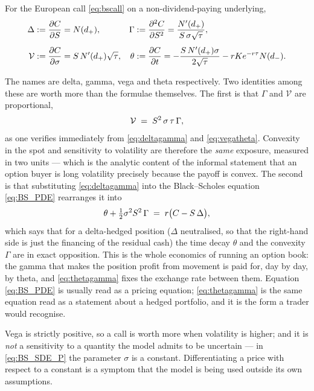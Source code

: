 \begin{proposition}\label{prop:greeks}
For the European call \eqref{eq:bscall} on a non-dividend-paying underlying,
\begin{align}
\Delta &:= \frac{\partial C}{\partial S} = N(d_+), &
\Gamma &:= \frac{\partial^2 C}{\partial S^2} = \frac{N'(d_+)}{S\,\sigma\sqrt{\tau}}, \label{eq:deltagamma}\\[4pt]
\mathcal{V} &:= \frac{\partial C}{\partial \sigma} = S\,N'(d_+)\sqrt{\tau}, &
\theta &:= \frac{\partial C}{\partial t} = -\frac{S\,N'(d_+)\sigma}{2\sqrt{\tau}} - r K e^{-r\tau}N(d_-). \label{eq:vegatheta}
\end{align}
\qedopen
\end{proposition}

The names are delta, gamma, vega and theta respectively. Two identities among these are worth more than the formulae themselves. The first is that
$\Gamma$ and $\mathcal{V}$ are proportional,
\begin{equation}\label{eq:vegagamma}
\mathcal{V} \;=\; S^2\,\sigma\,\tau\,\Gamma ,
\end{equation}
as one verifies immediately from \eqref{eq:deltagamma} and \eqref{eq:vegatheta}. Convexity in the
spot and sensitivity to volatility are therefore the \emph{same} exposure, measured in two units ---
which is the analytic content of the informal statement that an option buyer is long volatility
precisely because the payoff is convex. The second is that substituting \eqref{eq:deltagamma} into the Black--Scholes equation
\eqref{eq:BS_PDE} rearranges it into
\begin{equation}\label{eq:thetagamma}
\theta + \tfrac12\sigma^2S^2\,\Gamma \;=\; r\bigl(C - S\,\Delta\bigr),
\end{equation}
which says that for a delta-hedged position ($\Delta$ neutralised, so that the right-hand side is
just the financing of the residual cash) the time decay $\theta$ and the convexity
$\Gamma$ are in exact opposition. This is the whole economics of running an option book:
the gamma that makes the position profit from movement is paid for, day by day, by theta, and
\eqref{eq:thetagamma} fixes the exchange rate between them. Equation \eqref{eq:BS_PDE} is usually
read as a pricing equation; \eqref{eq:thetagamma} is the same equation read as a statement about a
hedged portfolio, and it is the form a trader would recognise.

Vega is strictly positive, so a call is worth more when volatility is
higher; and it is \emph{not} a sensitivity to a quantity the model admits to be uncertain --- in
\eqref{eq:BS_SDE_P} the parameter $\sigma$ is a constant. Differentiating a price with respect to a
constant is a symptom that the model is being used outside its own assumptions. 


